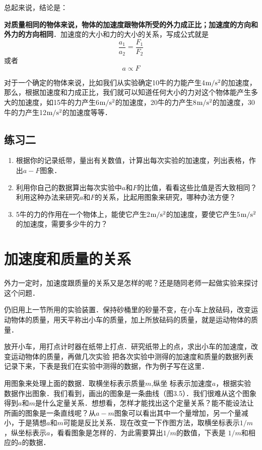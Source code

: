 总起来说，结论是：

\textbf{对质量相同的物体来说，物体的加速度跟物体所受的外力成正比；加速度的方向和外力的方向相同}．加速度的大小和力的大小的关系，写成公式就是
\[\frac{a_1}{a_2}=\frac{F_1}{F_2} \]
或者
\[a\propto F\]

对于一个确定的物体来说，比如我们从实验确定10牛的力能产生4$\text{m}/\text{s}^2$的加速度，那么，根据加速度和力成正比，我们就可以知道任何大小的力对这个物体能产生多大的加速度，如15牛的力产生6$\text{m}/\text{s}^2$的加速度，20牛的力产生8$\text{m}/\text{s}^2$的加速度，30牛的力产生12$\text{m}/\text{s}^2$的加速度等等．

\subsection*{练习二}
\begin{enumerate}
	\item 根据你的记录纸带，量出有关数值，计算出每次实验的加速度，列出表格，作出$a-F$图象．
	\item 利用你自己的数据算出每次实验中$a$和$F$的比值，看看这些比值是否大致相同？利用这种办法来研究$a$和$F$的关系，比起用图象来研究，哪种办法方便？
	\item 5牛的力的作用在一个物体上，能使它产生2$\text{m}/\text{s}^2$的加速度，要使它产生5$\text{m}/\text{s}^2$的加速度，需要多少牛的力？
\end{enumerate}


\section{加速度和质量的关系}
外力一定时，加速度跟质量的关系又是怎样的呢？还是随同老师一起做实验来探讨这个问题．

仍旧用上一节所用的实验装置．保持砂桶里的砂量不变，在小车上放砝码，改变运动物体的质量，用天平称出小车的质量，加上所放砝码的质量，就是运动物体的质量．

放开小车，用打点计时器在纸带上打点．研究纸带上的点，求出小车的加速度，改变运动物体的质量，再做几次实验
把各次实验中测得的加速度和质量的数据列表记录下来，下表是我们在实验中测得的数据，作为例子写在这里．

用图象来处理上面的数据．取横坐标表示质量$m$,纵坐
标表示加速度$a$，根据实验数据作出图象．我们看到，画出的图象是一条曲线（图3.5）．我们很难从这个图象得到$a$和$m$是什么定量关系．想想看，怎样才能找出这个定量关系？能不能设法让所画的图象是一条直线呢？从$a-m$图象可以看出其中一个量增加，另一个量减小，于是猜想$a$和$m$可能是反比关系．现在改变一下作图方法，取横坐标表示$1/m$，纵坐标表示$a$，看看图象是怎样的．为此需要算出$1/m$的数值，下表是
$1/m$和相应的$a$的数据．


